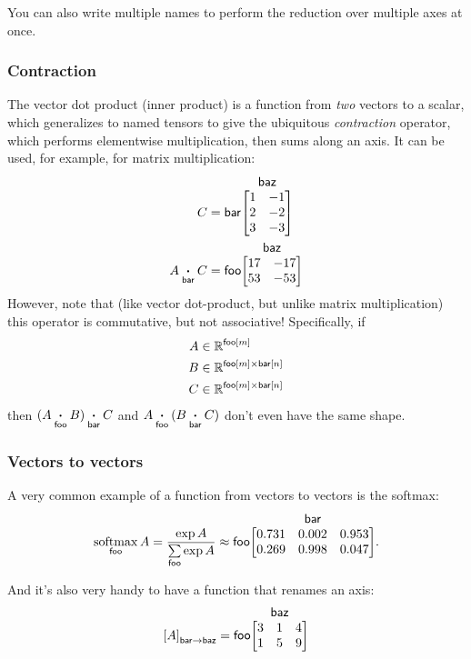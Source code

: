 \documentclass{article}
\makeatletter
\newcommand{\nmatrix}[3]{\name{#1}\begin{array}[b]{@{}c@{}}\name{#2}\\\begin{bmatrix}#3\end{bmatrix}\end{array}}
\makeatother
\begin{document}
You can also write multiple names to perform the reduction over multiple axes at once.

\subsubsection{Contraction}

The vector dot product (inner product) is a function from \emph{two} vectors to a scalar, which generalizes to named tensors to give the ubiquitous \emph{contraction} operator, which performs elementwise multiplication, then sums along an axis. It can be used, for example, for matrix multiplication:
\begin{align*}
C &= \nmatrix{bar}{baz}{
  1 & -1 \\ 2 & -2 \\ 3 & -3
} \\
A \ndot{bar} C &= \nmatrix{foo}{baz}{
  17 & -17 \\
  53 & -53
}
\end{align*}
However, note that (like vector dot-product, but unlike matrix multiplication) this operator is commutative, but not associative! Specifically, if
\begin{align*}
A &\in \mathbb{R}^{\mathsf{foo}[m]} \\
B &\in \mathbb{R}^{\mathsf{foo}[m] \times\mathsf{bar}[n]} \\
C &\in \mathbb{R}^{\mathsf{foo}[m] \times\mathsf{bar}[n]}
\end{align*}
then $(A \mathbin{\mathop{\boldsymbol\cdot}\limits_{\mathsf{foo}}} B) \mathbin{\mathop{\boldsymbol\cdot}\limits_{\mathsf{bar}}} C$ and $A \mathbin{\mathop{\boldsymbol\cdot}\limits_{\mathsf{foo}}} (B \mathbin{\mathop{\boldsymbol\cdot}\limits_{\mathsf{bar}}} C)$ don't even have the same shape.

\subsubsection{Vectors to vectors}

A very common example of a function from vectors to vectors is the softmax:
\begin{equation*}
  \nfun{foo}{softmax} A = \frac{\exp A}{\nsum{foo} \exp A} \approx \nmatrix{foo}{bar}{
    0.731 & 0.002 & 0.953 \\
    0.269 & 0.998 & 0.047
  }.
\end{equation*}

And it's also very handy to have a function that renames an axis:
\begin{equation*}
\nmov{bar}{baz}{A} = \nmatrix{foo}{baz}{
  3 & 1 & 4 \\
  1 & 5 & 9
}
\end{equation*}
\end{document}
